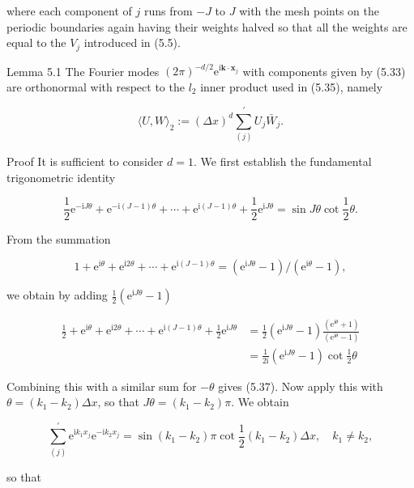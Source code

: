 \documentclass[10pt]{article}
\begin{document}
where each component of \(j\) runs from \(-J\) to \(J\) with the mesh points on the periodic boundaries again having their weights halved so that all the weights are equal to the \(V_{j}\) introduced in (5.5).

Lemma 5.1 The Fourier modes \((2 \pi)^{-d / 2} \mathrm{e}^{\mathrm{i} \mathbf{k} \cdot \mathbf{x}_{j}}\) with components given by (5.33) are orthonormal with respect to the \(l_{2}\) inner product used in (5.35), namely

\[
\langle U, W\rangle_{2}:=(\Delta x)^{d} \sum_{(j)}^{\prime} U_{j} \bar{W}_{j} .
\]

Proof It is sufficient to consider \(d=1\). We first establish the fundamental trigonometric identity

\[
\frac{1}{2} \mathrm{e}^{-\mathrm{i} J \theta}+\mathrm{e}^{-\mathrm{i}(J-1) \theta}+\cdots+\mathrm{e}^{\mathrm{i}(J-1) \theta}+\frac{1}{2} \mathrm{e}^{\mathrm{i} J \theta}=\sin J \theta \cot \frac{1}{2} \theta .
\]

From the summation

\[
1+\mathrm{e}^{\mathrm{i} \theta}+\mathrm{e}^{\mathrm{i} 2 \theta}+\cdots+\mathrm{e}^{\mathrm{i}(J-1) \theta}=\left(\mathrm{e}^{\mathrm{i} J \theta}-1\right) /\left(\mathrm{e}^{\mathrm{i} \theta}-1\right),
\]

we obtain by adding \(\frac{1}{2}\left(\mathrm{e}^{\mathrm{i} J \theta}-1\right)\)

\[
\begin{aligned}
\frac{1}{2}+\mathrm{e}^{\mathrm{i} \theta}+\mathrm{e}^{\mathrm{i} 2 \theta}+\cdots+\mathrm{e}^{\mathrm{i}(J-1) \theta}+\frac{1}{2} \mathrm{e}^{\mathrm{i} J \theta} & =\frac{1}{2}\left(\mathrm{e}^{\mathrm{i} J \theta}-1\right) \frac{\left(\mathrm{e}^{\mathrm{i} \theta}+1\right)}{\left(\mathrm{e}^{\mathrm{i} \theta}-1\right)} \\
& =\frac{1}{2 \mathrm{i}}\left(\mathrm{e}^{\mathrm{i} J \theta}-1\right) \cot \frac{1}{2} \theta
\end{aligned}
\]

Combining this with a similar sum for \(-\theta\) gives (5.37). Now apply this with \(\theta=\left(k_{1}-k_{2}\right) \Delta x\), so that \(J \theta=\left(k_{1}-k_{2}\right) \pi\). We obtain

\[
\sum_{(j)}^{\prime} \mathrm{e}^{\mathrm{i} k_{1} x_{j}} \mathrm{e}^{-\mathrm{i} k_{2} x_{j}}=\sin \left(k_{1}-k_{2}\right) \pi \cot \frac{1}{2}\left(k_{1}-k_{2}\right) \Delta x, \quad k_{1} \neq k_{2},
\]

so that
\end{document}
